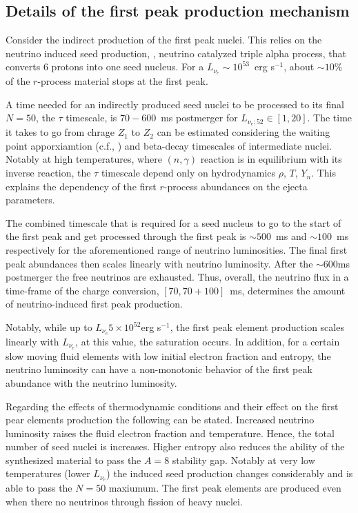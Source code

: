 \subsection{Details of the first peak production mechanism}

Consider the indirect production of the first peak nuclei. This relies on the neutrino induced seed production, \eg, neutrino catalyzed triple alpha process, that converts $6$ protons into one seed nucleus. For a $L_{\nu_e}\sim 10^{53}$~erg s$^{-1}$, about $\sim10\%$ of the $r$-process material stops at the first peak. 

A time needed for an indirectly produced seed nuclei to be processed to its final $N=50$, the $\tau$ timescale, is $70-600$~ms postmerger for $L_{\nu_e;52}\in[1,20]$. The time it takes to go from chrage $Z_1$ to $Z_2$ can be estimated considering the waiting point apporxiamtion (c.f., \cite{Kratz et al., 1993}) and beta-decay timescales of intermediate nuclei. Notably at high temperatures, where  $(n,\gamma)$ reaction is in equilibrium with its inverse reaction, the $\tau$ timescale depend only on hydrodynamics $\rho$, $T$, $Y_n$. 
This explains the dependency of the first $r$-process abundances on the ejecta parameters. 

The combined timescale that is required for a seed nucleus to go to the start of the first \rproc{} peak and get processed through the first peak is $\sim500$~ms and $\sim100$~ms respectively for the aforementioned range of neutrino luminosities. The final first peak abundances then scales linearly with neutrino luminosity. After the $\sim600$ms postmerger the free neutrinos are exhausted.
Thus, overall, the neutrino flux in a time-frame of the charge conversion, $[70, 70+100]$~ms, determines the amount of neutrino-induced first peak production. 

Notably, while up to $L_{\nu_e}5\times10^{52}$erg s$^{-1}$, the first peak element production scales linearly with $L_{\nu_e}$, at this value, the saturation occurs. In addition, for a certain slow moving fluid elements with low initial electron fraction and entropy, the neutrino luminosity can have a non-monotonic behavior of the first peak abundance with the neutrino luminosity.

Regarding the effects of thermodynamic conditions and their effect on the first pear elements production the following can be stated. Increased neutrino luminosity raises the fluid electron fraction and temperature. Hence, the total number of seed nuclei is increases. Higher entropy also reduces the ability of the synthesized material to pass the $A=8$ stability gap. Notably at very low temperatures (lower $L_{\nu_e}$) the induced seed production changes considerably and is able to pass the $N=50$ maxiumum. 
The first peak elements are produced even when there no neutrinos through fission of heavy nuclei.


